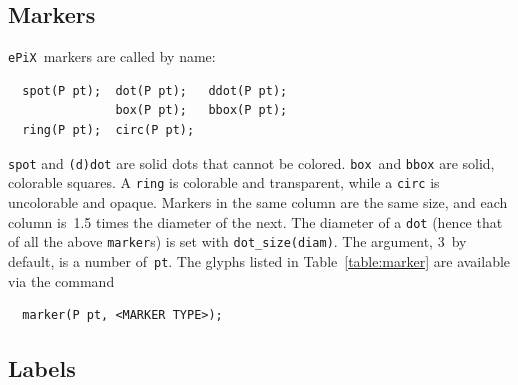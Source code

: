 \documentclass[12pt]{report}
\newcommand{\code}[1]{\texttt{#1}}
\newcommand{\ePiX}{\code{ePiX}}
\begin{document}
\subsection*{Markers}

 \ePiX\ markers are called
by name: 
\begin{verbatim}
  spot(P pt);  dot(P pt);   ddot(P pt);
               box(P pt);   bbox(P pt);  
  ring(P pt);  circ(P pt);
\end{verbatim}
\code{spot} and \code{(d)dot} are solid dots that cannot be colored.
\code{box}~and \code{bbox} are solid, colorable squares.  A
\code{ring} is colorable and transparent, while a \code{circ} is
uncolorable and opaque. Markers in the same column are the same size,
and each column is~1.5 times the diameter of the next. The diameter of
a \code{dot} (hence that of all the above \code{marker}s) is set with
\code{dot\_size(diam)}. The argument, 3~by default, is a number
of~\code{pt}.  The glyphs listed in Table~\ref{table:marker} are
available via the command
\begin{verbatim}
  marker(P pt, <MARKER TYPE>);
\end{verbatim}
\begin{table}[tb]
  \begin{center}
    
  \end{center}
  \caption{\ePiX's \code{marker} types.}
  \label{table:marker}
\end{table}


\subsection*{Labels}
\end{document}
